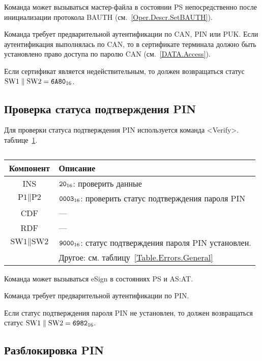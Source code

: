 Команда может вызываться  мастер-файла
в состоянии PS непосредственно после 
инициализации протокола BAUTH (см.~\ref{Oper.Descr.SetBAUTH}).

Команда требует предварительной аутентификации по CAN, PIN или PUK. 
Если аутентификация выполнялась по CAN,
то в сертификате терминала должно быть установлено 
право доступа по паролю CAN (см.~\ref{DATA.Access}).

Если сертификат является недействительным, то должен 
возвращаться статус 
$\text{SW1} \parallel \text{SW2} = \texttt{6A80}_{16}$.

\subsection{Проверка статуса подтверждения PIN}
\label{Oper.Descr.VerifyAuth}

Для проверки статуса подтверждения PIN используется команда <Verify>.
 таблице~\ref{Table.Oper.VerifyAuthCmd}.

\begin{table}[hbt]
\caption{}\label{Table.Oper.VerifyAuthCmd}
\begin{tabular}{|c|p{14cm}|}
\hline
Компонент & Описание \\
\hline
\hline
INS & $\texttt{20}_{16}$: проверить данные\\
\hline
$\text{P1} \parallel \text{P2}$ & $\texttt{0003}_{16}$: проверить статус подтверждения пароля PIN \\
\hline
CDF & --- \\
\hline 
RDF &  --- \\
\hline
$\text{SW1} \parallel \text{SW2}$ & $\texttt{9000}_{16}$: 
 статус подтверждения пароля PIN установлен.\\
 & Другое: см. таблицу~\ref{Table.Errors.General} \\
\hline
\end{tabular}
\end{table}

Команда может вызываться  eSign в состояниях 
PS и AS:AT. 

Команда требует предварительной аутентификации по PIN.

Если статус подтверждения пароля PIN не установлен, то должен 
возвращаться статус $\text{SW1} \parallel \text{SW2} = \texttt{6982}_{16}$.

\subsection{Разблокировка PIN}
\label{Oper.Descr.UnblockPIN}


